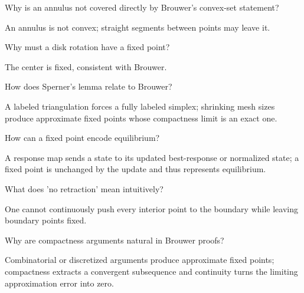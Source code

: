 \begin{problem}\label{prob:ii17-problem-06}
Why is an annulus not covered directly by Brouwer's convex-set statement?
\end{problem}
\begin{solution}
An annulus is not convex; straight segments between points may leave it.
\end{solution}

\begin{problem}\label{prob:ii17-problem-07}
Why must a disk rotation have a fixed point?
\end{problem}
\begin{solution}
The center is fixed, consistent with Brouwer.
\end{solution}

\begin{problem}\label{prob:ii17-problem-08}
How does Sperner's lemma relate to Brouwer?
\end{problem}
\begin{solution}
A labeled triangulation forces a fully labeled simplex; shrinking mesh sizes produce approximate fixed points whose compactness limit is an exact one.
\end{solution}

\begin{problem}\label{prob:ii17-problem-09}
How can a fixed point encode equilibrium?
\end{problem}
\begin{solution}
A response map sends a state to its updated best-response or normalized state; a fixed point is unchanged by the update and thus represents equilibrium.
\end{solution}

\begin{problem}\label{prob:ii17-problem-10}
What does 'no retraction' mean intuitively?
\end{problem}
\begin{solution}
One cannot continuously push every interior point to the boundary while leaving boundary points fixed.
\end{solution}

\begin{problem}\label{prob:ii17-problem-11}
Why are compactness arguments natural in Brouwer proofs?
\end{problem}
\begin{solution}
Combinatorial or discretized arguments produce approximate fixed points; compactness extracts a convergent subsequence and continuity turns the limiting approximation error into zero.
\end{solution}


